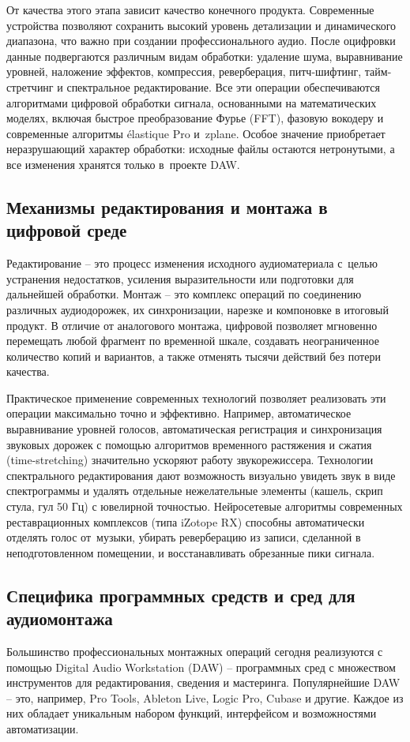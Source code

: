 \documentclass{ou}
\begin{document}
От качества этого этапа зависит качество конечного продукта. Современные устройства позволяют сохранить высокий уровень детализации и динамического диапазона, что важно при создании профессионального аудио. После оцифровки данные подвергаются различным видам обработки: удаление шума, выравнивание уровней, наложение эффектов, компрессия, реверберация, питч-шифтинг, тайм-стретчинг и спектральное редактирование. Все эти операции обеспечиваются алгоритмами цифровой обработки сигнала, основанными на математических моделях, включая быстрое преобразование Фурье (FFT), фазовую вокодеру и современные алгоритмы élastique Pro и~zplane. Особое значение приобретает неразрушающий характер обработки: исходные файлы остаются нетронутыми, а все изменения хранятся только в~проекте DAW.
\subsection{Механизмы редактирования и монтажа в цифровой среде}
Редактирование -- это процесс изменения исходного аудиоматериала с~целью устранения недостатков, усиления выразительности или подготовки для дальнейшей обработки. Монтаж -- это комплекс операций по соединению различных аудиодорожек, их синхронизации, нарезке и компоновке в итоговый продукт. В отличие от аналогового монтажа, цифровой позволяет мгновенно перемещать любой фрагмент по временной шкале, создавать неограниченное количество копий и вариантов, а также отменять тысячи действий без потери качества.

Практическое применение современных технологий позволяет реализовать эти операции максимально точно и эффективно. Например, автоматическое выравнивание уровней голосов, автоматическая регистрация и синхронизация звуковых дорожек с помощью алгоритмов временного растяжения и сжатия (time-stretching) значительно ускоряют работу звукорежиссера. Технологии спектрального редактирования дают возможность визуально увидеть звук в виде спектрограммы и удалять отдельные нежелательные элементы (кашель, скрип стула, гул 50 Гц) с ювелирной точностью. Нейросетевые алгоритмы современных реставрационных комплексов (типа iZotope RX) способны автоматически отделять голос от~музыки, убирать реверберацию из записи, сделанной в неподготовленном помещении, и восстанавливать обрезанные пики сигнала.
\subsection{Специфика программных средств и сред для аудиомонтажа}
Большинство профессиональных монтажных операций сегодня реализуются с помощью Digital Audio Workstation (DAW) -- программных сред с множеством инструментов для редактирования, сведения и мастеринга. Популярнейшие DAW -- это, например, Pro Tools, Ableton Live, Logic Pro, Cubase и другие. Каждое из них обладает уникальным набором функций, интерфейсом и возможностями автоматизации.
\end{document}
